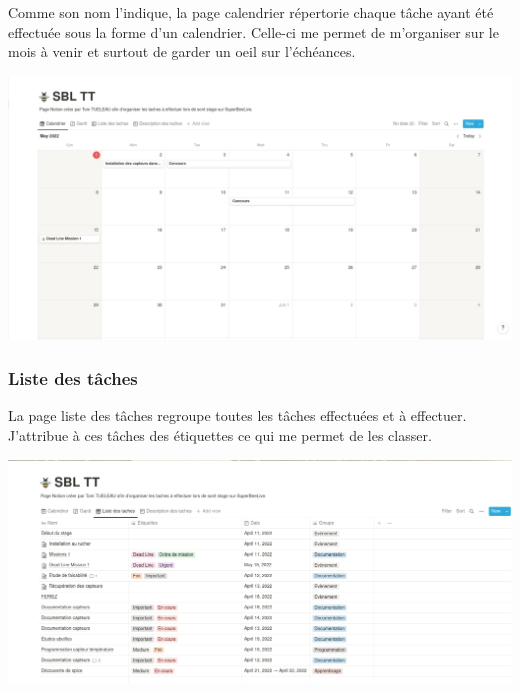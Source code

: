 \documentclass[11pt,french,a4paper]{article}
\begin{document}
Comme son nom l'indique, la page calendrier répertorie chaque tâche ayant été effectuée sous la forme d'un calendrier. Celle-ci me permet de m'organiser sur le mois à venir et surtout de garder un oeil sur l'échéances. 
\begin{center}	
\includegraphics[scale=0.35]{../img/notioncalender.png}
\label{Calendrier}
\end{center}

\subsubsection{Liste des tâches}
La page liste des tâches regroupe toutes les tâches effectuées et à effectuer. J'attribue à ces tâches des étiquettes ce qui me permet de les classer.   
\begin{center}	
\includegraphics[scale=0.35]{../img/notionlistesdestaches.png}
\label{Liste des taches}
\end{center}
\end{document}
